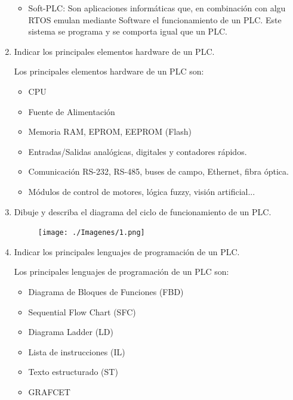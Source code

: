 \documentclass[10pt,a4paper,spanish]{article}
\begin{document}
\begin{enumerate}
\begin{itemize}
      \item Soft-PLC: Son aplicaciones informáticas que, en combinación con algu RTOS emulan mediante Software el funcionamiento de un PLC. Este sistema se programa y se comporta igual que un PLC.
    \end{itemize}

    \newpage
    \item Indicar los principales elementos hardware de un PLC.

    \noindent
    Los principales elementos hardware de un PLC son:

    \begin{itemize}
      \item CPU
      \item Fuente de Alimentación
      \item Memoria RAM, EPROM, EEPROM (Flash)
      \item Entradas/Salidas analógicas, digitales y contadores rápidos.
      \item Comunicación RS-232, RS-485, buses de campo, Ethernet, fibra óptica.
      \item Módulos de control de motores, lógica fuzzy, visión artificial...
    \end{itemize}

    \item Dibuje y describa el diagrama del ciclo de funcionamiento de un PLC.

    \noindent
    \begin{figure}[!hbp]
      \centering  \texttt{[image: ./Imagenes/1.png]}
    \end{figure}


    \item Indicar los principales lenguajes de programación de un PLC.

    \noindent
    Los principales lenguajes de programación de un PLC son:

    \begin{itemize}
      \item Diagrama de Bloques de Funciones (FBD)
      \item Sequential Flow Chart (SFC)
      \item Diagrama Ladder (LD)
      \item Lista de instrucciones (IL)
      \item Texto estructurado (ST)
      \item GRAFCET
    \end{itemize}


\end{enumerate}
\end{document}
